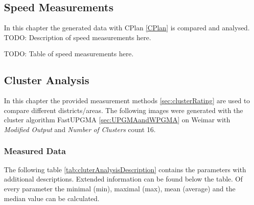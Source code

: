 \subsection{Speed Measurements}
In this chapter the generated data with CPlan \ref{CPlan} is compared and analysed. 
\label{sec:measurements-speed}
TODO: Description of speed measurements here. 

TODO: Table of speed measurements here.

\subsection{Cluster Analysis}
\label{sec:measurements-cluster-analysis}
In this chapter the provided measurement methods \ref{sec:clusterRating} are used to compare different districts/areas. The following images were generated with the cluster algorithm FastUPGMA \ref{sec:UPGMAandWPGMA} on Weimar with \textit{Modified Output} and \textit{Number of Clusters} count 16.

\subsubsection{Measured Data}
\label{sec:ClusterAnalysisMeasurements}
The following table \ref{tab:cluterAnalysisDescription} contains the parameters with additional descriptions. Extended information can be found below the table. Of every parameter the minimal (min), maximal (max), mean (average) and the median value can be calculated.

